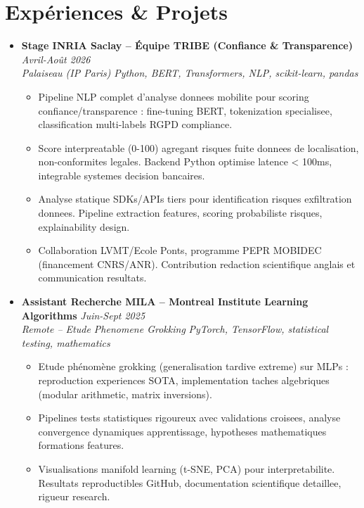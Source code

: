 \documentclass[a4paper,11pt]{article}
\begin{document}
\section{Exp\'eriences \& Projets}
\begin{itemize}[leftmargin=*, label={-}]

\item \textbf{Stage INRIA Saclay -- \'Equipe TRIBE (Confiance \& Transparence)} \hfill \textit{Avril-Ao\^ut 2026} \\
\textit{Palaiseau (IP Paris)} \hfill \textit{Python, BERT, Transformers, NLP, scikit-learn, pandas}
\vspace{-2pt}
    \begin{itemize}[leftmargin=0.4cm, nosep, label=\tiny$\bullet$]
        \item \small{Pipeline NLP complet d'analyse donnees mobilite pour scoring confiance/transparence : fine-tuning BERT, tokenization specialisee, classification multi-labels RGPD compliance.}
        \item \small{Score interpreatable (0-100) agregant risques fuite donnees de localisation, non-conformites legales. Backend Python optimise latence < 100ms, integrable systemes decision bancaires.}
        \item \small{Analyse statique SDKs/APIs tiers pour identification risques exfiltration donnees. Pipeline extraction features, scoring probabiliste risques, explainability design.}
        \item \small{Collaboration LVMT/Ecole Ponts, programme PEPR MOBIDEC (financement CNRS/ANR). Contribution redaction scientifique anglais et communication resultats.}
    \end{itemize}
\vspace{3pt}

\item \textbf{Assistant Recherche MILA -- Montreal Institute Learning Algorithms} \hfill \textit{Juin-Sept 2025} \\
\textit{Remote -- Etude Phenomene Grokking} \hfill \textit{PyTorch, TensorFlow, statistical testing, mathematics}
\vspace{-2pt}
    \begin{itemize}[leftmargin=0.4cm, nosep, label=\tiny$\bullet$]
        \item \small{Etude phénomène grokking (generalisation tardive extreme) sur MLPs : reproduction experiences SOTA, implementation taches algebriques (modular arithmetic, matrix inversions).}
        \item \small{Pipelines tests statistiques rigoureux avec validations croisees, analyse convergence dynamiques apprentissage, hypotheses mathematiques formations features.}
        \item \small{Visualisations manifold learning (t-SNE, PCA) pour interpretabilite. Resultats reproductibles GitHub, documentation scientifique detaillee, rigueur research.}
    \end{itemize}
\vspace{3pt}


\end{itemize}
\end{document}
